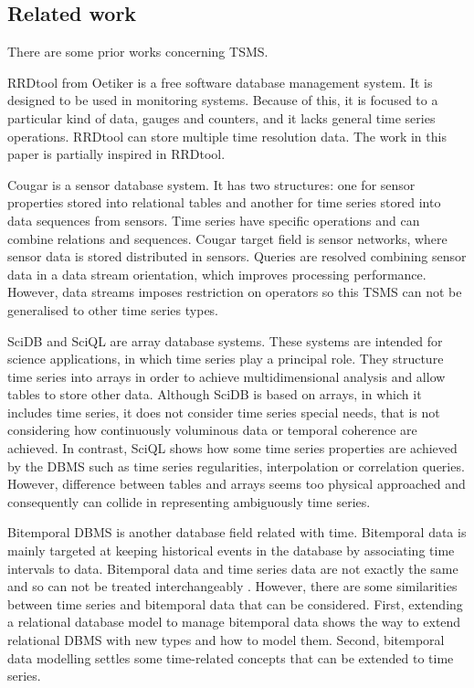 \subsection{Related work}

There are some prior works concerning TSMS. 

RRDtool from Oetiker \cite{rrdtool} is a free software database
management system. It is designed to be used in monitoring
systems. Because of this, it is focused to a particular kind of data,
gauges and counters, and it lacks general time series
operations. RRDtool can store multiple time resolution data. The work
in this paper is partially inspired in RRDtool.

Cougar \cite{bonnet01} is a sensor database system. It has two
structures: one for sensor properties stored into relational tables
and another for time series stored into data sequences from
sensors. Time series have specific operations and can combine
relations and sequences. Cougar target field is sensor networks, where
sensor data is stored distributed in sensors. Queries are resolved
combining sensor data in a data stream orientation, which improves
processing performance. However, data streams imposes restriction on
operators so this TSMS can not be generalised to other time series
types. 


SciDB \cite{stonebraker09:scidb} and SciQL \cite{zhang11} are array
database systems. These systems are intended for science applications,
in which time series play a principal role. They structure time series
into arrays in order to achieve multidimensional analysis and allow
tables to store other data.  Although SciDB is based on arrays, in
which it includes time series, it does not consider time series
special needs, that is not considering how continuously voluminous
data or temporal coherence are achieved.  In contrast, SciQL shows how
some time series properties are achieved by the DBMS such as time
series regularities, interpolation or correlation queries.  However,
difference between tables and arrays seems too physical approached and
consequently can collide in representing ambiguously time series.

Bitemporal DBMS is another database field related with
time. Bitemporal data is mainly targeted at keeping historical events
in the database by associating time intervals to data.  Bitemporal
data and time series data are not exactly the same and so can not be
treated interchangeably \cite{schmidt95}. However, there are some
similarities between time series and bitemporal data that can be
considered. First, extending a relational database model to manage
bitemporal data shows the way to extend relational DBMS with new types
and how to model them. Second, bitemporal data modelling settles some
time-related concepts that can be extended to time series.

